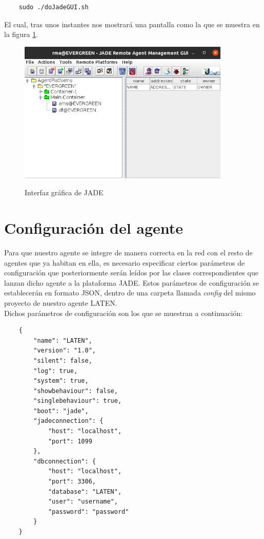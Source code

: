 \begin{lstlisting}
    sudo ./doJadeGUI.sh 
\end{lstlisting}

El cual, tras unos instantes nos mostrará una pantalla como la que se muestra en la figura \ref{img:jade1}.

\begin{figure}[h]
\centering
\includegraphics[width=0.9\textwidth]{logos/jade1.png}\\[1.4cm]
\caption{Interfaz gráfica de JADE}
\label{img:jade1}
\end{figure}

\section{Configuración del agente}

Para que nuestro agente se integre de manera correcta en la red con el resto de agentes que ya habitan en ella, es necesario especificar ciertos parámetros de configuración que posteriormente serán leídos por las clases correspondientes que lanzan dicho agente a la plataforma JADE. Estos parámetros de configuración se establecerán en formato JSON, dentro de una carpeta llamada \textit{config} del mismo proyecto de nuestro agente LATEN.\\

Dichos parámetros de configuración son los que se muestran a continuación:

\begin{lstlisting}
    {
        "name": "LATEN",
        "version": "1.0",
        "silent": false,
        "log": true,
        "system": true,
        "showbehaviour": false,
        "singlebehaviour": true,
        "boot": "jade",
        "jadeconnection": {
            "host": "localhost",
            "port": 1099
        },
        "dbconnection": {
            "host": "localhost",
            "port": 3306,
            "database": "LATEN",
            "user": "username",
            "password": "password"
        }
    }
\end{lstlisting}

